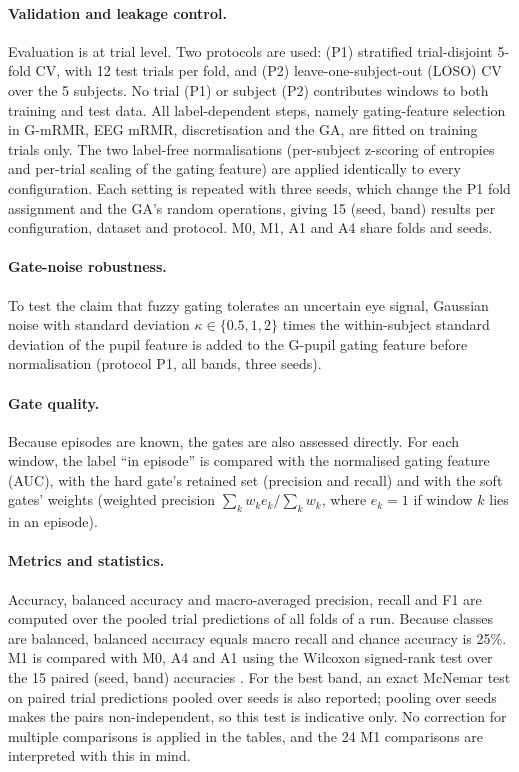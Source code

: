 \paragraph{Validation and leakage control.} Evaluation is at trial level. Two protocols are used: (P1) stratified trial-disjoint 5-fold CV, with 12 test trials per fold, and (P2) leave-one-subject-out (LOSO) CV over the 5 subjects. No trial (P1) or subject (P2) contributes windows to both training and test data. All label-dependent steps, namely gating-feature selection in G-mRMR, EEG mRMR, discretisation and the GA, are fitted on training trials only. The two label-free normalisations (per-subject z-scoring of entropies and per-trial scaling of the gating feature) are applied identically to every configuration. Each setting is repeated with three seeds, which change the P1 fold assignment and the GA's random operations, giving 15 (seed, band) results per configuration, dataset and protocol. M0, M1, A1 and A4 share folds and seeds.

\paragraph{Gate-noise robustness.} To test the claim that fuzzy gating tolerates an uncertain eye signal, Gaussian noise with standard deviation $\kappa\in\{0.5,1,2\}$ times the within-subject standard deviation of the pupil feature is added to the G-pupil gating feature before normalisation (protocol P1, all bands, three seeds).

\paragraph{Gate quality.} Because episodes are known, the gates are also assessed directly. For each window, the label ``in episode'' is compared with the normalised gating feature (AUC), with the hard gate's retained set (precision and recall) and with the soft gates' weights (weighted precision $\sum_k w_k e_k/\sum_k w_k$, where $e_k=1$ if window $k$ lies in an episode).

\paragraph{Metrics and statistics.} Accuracy, balanced accuracy and macro-averaged precision, recall and F1 are computed over the pooled trial predictions of all folds of a run. Because classes are balanced, balanced accuracy equals macro recall and chance accuracy is 25\%. M1 is compared with M0, A4 and A1 using the Wilcoxon signed-rank test over the 15 paired (seed, band) accuracies \cite{Demsar2006}. For the best band, an exact McNemar test \cite{McNemar1947} on paired trial predictions pooled over seeds is also reported; pooling over seeds makes the pairs non-independent, so this test is indicative only. No correction for multiple comparisons is applied in the tables, and the 24 M1 comparisons are interpreted with this in mind.


